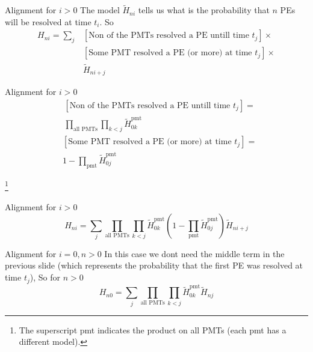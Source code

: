 \documentclass{beamer}
\newcommand\blfootnote[1]{%
  \begingroup
  \renewcommand\thefootnote{}\footnote{#1}%
  \addtocounter{footnote}{-1}%
  \endgroup
}
\begin{document}
\begin{frame}{Alignment for $i>0$}
The model $\tilde{H}_{ni}$ tells us what is the probability that $n$ PEs will be resolved at time $t_i$. So 
\begin{equation}
\begin{split}
H_{ni}=\sum_j&[\text{Non of the PMTs resolved a PE untill time }t_j]\times\\
&[\text{Some PMT resolved a PE (or more) at time }t_j]\times\\
&\tilde{H}_{ni+j}
\end{split}
\end{equation}
\end{frame}

\begin{frame}{Alignment for $i>0$}
\begin{equation}
\begin{split}
&[\text{Non of the PMTs resolved a PE untill time }t_j]=\\
&\prod_{\text{all PMTs}}\prod_{k<j}\tilde{H}_{0k}^{\text{pmt}}
\end{split}
\end{equation}
\begin{equation}
\begin{split}
&[\text{Some PMT resolved a PE (or more) at time }t_j]=\\
&1-\prod_{\text{pmt}}\tilde{H}_{0j}^{\text{pmt}}
\end{split}
\end{equation}

\blfootnote{The superscript pmt indicates the product on all PMTs (each pmt has a different model).}
\end{frame}

\begin{frame}{Alignment for $i>0$}
\begin{equation}
H_{ni}=\sum_j\prod_{\text{all PMTs}}\prod_{k<j}\tilde{H}_{0k}^{\text{pmt}}\left(1-\prod_{\text{pmt}}\tilde{H}_{0j}^{\text{pmt}}\right)\tilde{H}_{ni+j}
\end{equation}
\end{frame}

\begin{frame}{Alignment for $i=0, n>0$}
In this case we dont need the middle term in the previous slide (which represents the probability that the first PE was resolved at time $t_j$), So for $n>0$
\begin{equation}
H_{n0}=\sum_j\prod_{\text{all PMTs}}\prod_{k<j}\tilde{H}_{0k}^{\text{pmt}}\tilde{H}_{nj}
\end{equation}
\end{frame}
\end{document}
